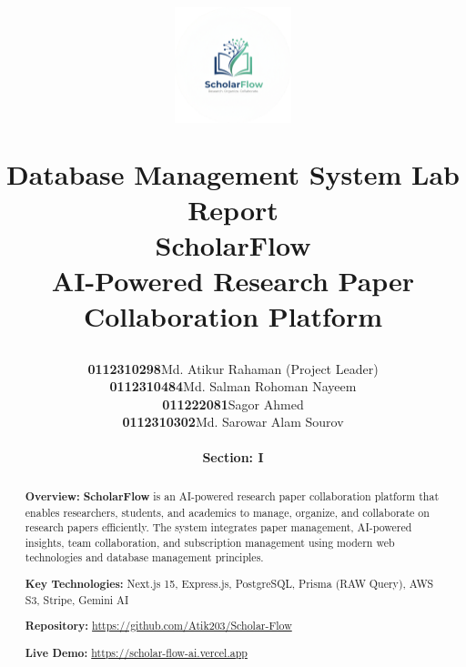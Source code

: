 \documentclass[12pt,a4paper]{report}
\title{
    \vspace{-2cm}
    \begin{figure}[h]
    \centering
    \includegraphics[width=0.3\textwidth]{images/logos/logo.png}
    \end{figure}
    \vspace{0.3cm}
    {\Large\textbf{Database Management System Lab Report}}\\
    \vspace{0.4cm}
    {\LARGE\textbf{ScholarFlow}}\\
    \vspace{0.3cm}
    {\large AI-Powered Research Paper Collaboration Platform}\\
    \vspace{0.5cm}
  
}
\author{
    \begin{tabular}{rl}
    \textbf{0112310298} & Md. Atikur Rahaman (Project Leader) \\
    \textbf{0112310484} & Md. Salman Rohoman Nayeem \\
    \textbf{011222081} & Sagor Ahmed \\
    \textbf{0112310302} & Md. Sarowar Alam Sourov \\
    \end{tabular}
    \\[0.75cm]
    {\normalsize\textbf{Section: I}}
}
\newcommand{\projectname}{\textbf{ScholarFlow}}
\begin{document}
\maketitle
\thispagestyle{empty}

\newpage

\begin{abstract}
\noindent
\textbf{Overview:} \projectname{} is an AI-powered research paper collaboration platform that enables researchers, students, and academics to manage, organize, and collaborate on research papers efficiently. The system integrates paper management, AI-powered insights, team collaboration, and subscription management using modern web technologies and database management principles.

\vspace{0.3cm}
\noindent
    \textbf{Key Technologies:} Next.js 15, Express.js, PostgreSQL, Prisma (RAW Query), AWS S3, Stripe, Gemini AI

\vspace{0.3cm}
\noindent
\textbf{Repository:} \url{https://github.com/Atik203/Scholar-Flow}

\vspace{0.3cm}
\noindent
\textbf{Live Demo:} \url{https://scholar-flow-ai.vercel.app}
\end{abstract}

\newpage

\tableofcontents
\newpage














\end{document}
